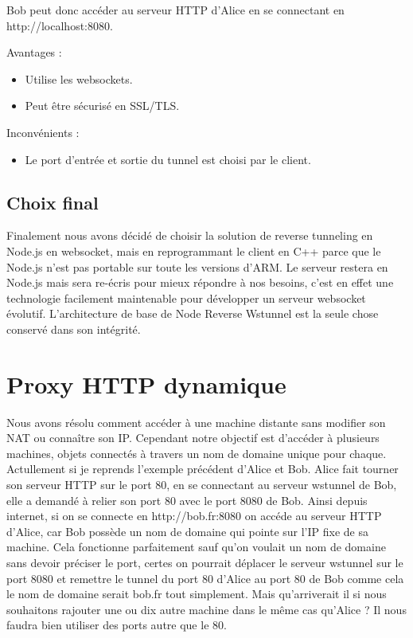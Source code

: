 Bob peut donc accéder au serveur HTTP d'Alice en se connectant en http://localhost:8080.

Avantages :
\begin{itemize}
    \item Utilise les websockets.
    \item Peut être sécurisé en SSL/TLS.
\end{itemize}

Inconvénients :
\begin{itemize}
    \item Le port d'entrée et sortie du tunnel est choisi par le client.
\end{itemize}

\subsection{Choix final}

Finalement nous avons décidé de choisir la solution de reverse tunneling en Node.js en websocket, mais en reprogrammant le client en C++ parce que le Node.js n'est pas portable sur toute les versions d'ARM. Le serveur restera en Node.js mais sera re-écris pour mieux répondre à nos besoins, c'est en effet une technologie facilement maintenable pour développer un serveur websocket évolutif. L'architecture de base de Node Reverse Wstunnel est la seule chose conservé dans son intégrité.

\section{Proxy HTTP dynamique}

Nous avons résolu comment accéder à une machine distante sans modifier son NAT ou connaître son IP. Cependant notre objectif est d'accéder à plusieurs machines, objets connectés à travers un nom de domaine unique pour chaque. Actullement si je reprends l'exemple précédent d'Alice et Bob. Alice fait tourner son serveur HTTP sur le port 80, en se connectant au serveur wstunnel de Bob, elle a demandé à relier son port 80 avec le port 8080 de Bob. Ainsi depuis internet, si on se connecte en http://bob.fr:8080 on accéde au serveur HTTP d'Alice, car Bob possède un nom de domaine qui pointe sur l'IP fixe de sa machine. Cela fonctionne parfaitement sauf qu'on voulait un nom de domaine sans devoir préciser le port, certes on pourrait déplacer le serveur wstunnel sur le port 8080 et remettre le tunnel du port 80 d'Alice au port 80 de Bob comme cela le nom de domaine serait bob.fr tout simplement. Mais qu'arriverait il si nous souhaitons rajouter une ou dix autre machine dans le même cas qu'Alice ? Il nous faudra bien utiliser des ports autre que le 80.

